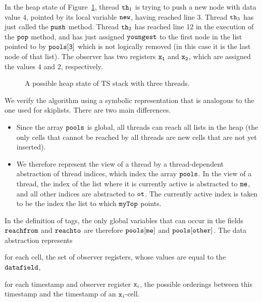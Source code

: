 In the heap state of Figure~\ref{fig:tsshape},
thread ${\tt th}_1$ is trying to push a new node with data value $4$, pointed by its local variable $\tt new$, having reached line 3.
Thread ${\tt th}_3$ has just called the ${\tt push}$ method.
Thread ${\tt th}_2$ has reached line 12 in the execution of the ${\tt pop}$ method,  and has just assigned ${\tt youngest}$ to the first node in the list
pointed to by $\tt pools[3]$ which is not logically removed (in this case it is the last node of that list).
The observer has two registers
$\tt x_1$ and $\tt x_2$, which are assigned the values $4$ and $2$,
respectively.

\begin{figure}
\center
	
\caption{A possible heap state of TS stack with three threads.}
\label{fig:tsshape}
\end{figure} 

We verify the algorithm using a symbolic representation that is analogous
to the one used for skiplists. There are two main differences.
\begin{itemize}
\item
  Since the array $\tt pools$ is global, all threads can reach all lists in
  the heap (the only cells that cannot be reached by all threads are
  new cells that are not yet inserted).
\item
  We therefore represent the view of a thread by a thread-dependent abstraction
  of thread indices, which index the array $\tt pools$. In the view of
  a thread, the index of the list where it is currently active
  is abstracted to $\tt me$, and all other
  indices are abstracted to $\tt ot$. The currently active index is taken to
  be the index the list to which $\tt myTop$ points.
\end{itemize}
In the definition of tags, the only global variables that can occur in
the fields $\mathtt{reachfrom}$ and $\mathtt{reachto}$ are therefore
$\tt pools[me]$ and $\tt pools[other]$. The data abstraction represents
\begin{inparaenum}[(i)]
\item
   for each cell,
   the set of observer registers, whose values are equal to the $\tt data field$,
\item
  for each timestamp and observer register $\mathtt{x}_i$,
  the possible orderings between this timestamp and the timestamp of an
  $\mathtt{x}_i$-cell.
\end{inparaenum}

